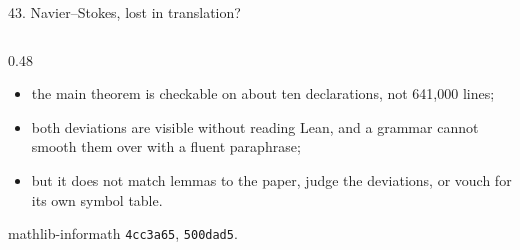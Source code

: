 \documentclass[10pt,aspectratio=169]{beamer}
\newcommand{\commit}[1]{\texttt{\footnotesize #1}}
\begin{document}
\begin{frame}{43. Navier--Stokes, lost in translation?}
\begin{columns}[T]
\begin{column}{0.48\textwidth}
      \begin{itemize}
        \item the main theorem is checkable on about ten declarations, not 641,000 lines;
        \item both deviations are visible without reading Lean, and a grammar cannot smooth
              them over with a fluent paraphrase;
        \item but it does not match lemmas to the paper, judge the deviations, or vouch for its
              own symbol table.
      \end{itemize}
      mathlib-informath \commit{4cc3a65}, \commit{500dad5}.
    \end{column}
  \end{columns}
\end{frame}
\end{document}
